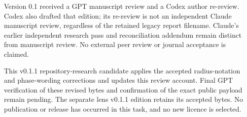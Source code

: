 \documentclass[11pt,a4paper]{article}
\theoremstyle{definition}
\theoremstyle{remark}
\begin{document}
Version 0.1 received a GPT manuscript review and a Codex
author re-review. Codex also drafted that edition; its
re-review is not an independent Claude manuscript review,
regardless of the retained legacy report filename. Claude's
earlier independent research pass and reconciliation addendum
remain distinct from manuscript review. No external peer
review or journal acceptance is claimed.

This v0.1.1 repository-research candidate applies the accepted
radius-notation and phase-wording corrections and updates
this review account. Final GPT verification of these revised
bytes and confirmation of the exact public payload remain
pending. The separate lens v0.1.1 edition retains its accepted
bytes. No publication or release has occurred in this task,
and no new licence is selected.


\begingroup\raggedright

\endgroup
\end{document}
